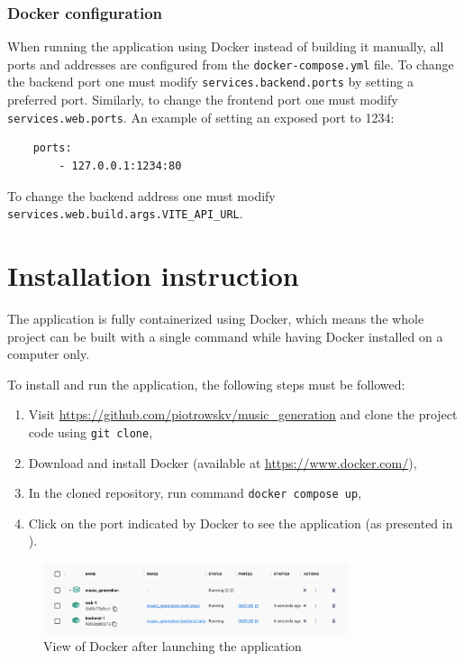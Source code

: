 \documentclass[a4paper, 11pt, twoside]{report}
\theoremstyle{definition}
\begin{document}
\subsubsection{Docker configuration}

When running the application using Docker instead of building it manually, all ports and addresses are configured from the \verb|docker-compose.yml| file. To change the backend port one must modify \verb|services.backend.ports| by setting a preferred port. Similarly, to change the frontend port one must modify \verb|services.web.ports|. An example of setting an exposed port to 1234:

\begin{verbatim}
    ports:
        - 127.0.0.1:1234:80
\end{verbatim} \par

To change the backend address one must modify \verb|services.web.build.args.VITE_API_URL|. \par


\section{Installation instruction} \label{sec:installation}

The application is fully containerized using Docker, which means the whole project can be built with a single command while having Docker installed on a computer only. \par
To install and run the application, the following steps must be followed:

\begin{enumerate}
    \item Visit \url{https://github.com/piotrowskv/music_generation} and clone the project code using \verb|git clone|,
    \item Download and install Docker (available at \url{https://www.docker.com/}),
    \item In the cloned repository, run command \verb|docker compose up|,
    \item Click on the port indicated by Docker to see the application (as presented in ).
\end{enumerate} \par

\begin{figure}
    \centering
    \includegraphics[width=0.8\textwidth]{assets/docker_sample.png}
    \caption{View of Docker after launching the application}
    \label{fig:docker}
\end{figure}
\end{document}
